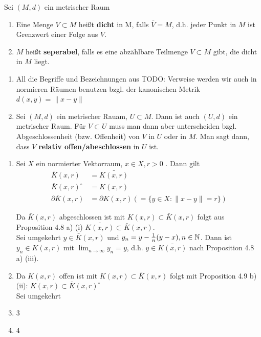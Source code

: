 \begin{definition}
	Sei $(M, d)$ ein metrischer Raum
	\begin{enumerate}[label=\alph*\upshape)]  
		\item Eine Menge $V \subset M$ hei{\ss}t \textbf{dicht} in M, falls $\bar V = M$, d.h. jeder Punkt in $M$ ist Grenzwert einer Folge aus $V$.
		\item $M$ hei{\ss}t \textbf{seperabel}, falls es eine abzählbare Teilmenge $V \subset M$ gibt, die dicht in $M$ liegt.
	\end{enumerate}
\end{definition}

\begin{bemerkung}
	\begin{enumerate}[label=\alph*\upshape)]   %
		\item All die Begriffe und Bezeichnungen aus TODO: Verweise werden wir auch in normieren Räumen benutzen bzgl. der kanonischen Metrik $d(x, y) = \| x - y\|$
		\item Sei $(M, d)$ ein metrischer Rauam, $U \subset M$. Dann ist auch $(U, d)$ ein metrischer Raum. Für $V \subset U$ muss man dann aber unterscheiden bzgl. Abgeschlossenheit (bzw. Offenheit) von $V$ in $U$ oder in $M$. Man sagt dann, dass $V$ \textbf{relativ offen/abeschlossen} in $U$ ist.
	\end{enumerate}	
\end{bemerkung}

\begin{beispiel}
	\begin{enumerate}[label=\alph*\upshape)]
		\item Sei $X$ ein normierter Vektorraum, $x \in X, r > 0$	. Dann gilt
			\begin{align*}
				\bar K(x, r) & = \bar{K(x, r)} \\
				\bar K(x, r)^{\circ} & = K(x, r) \\
				\partial \bar K(x, r) & = \partial K(x, r) (= \{ y \in X: \| x - y \| = r \} )
			\end{align*}
			\begin{beweis} %
				Da $ \bar K(x, r)$ abgeschlossen ist mit $K(x, r) \subset \bar K(x, r)$ folgt aus Proposition 4.8  a) (i) $\bar{K(x, r)} \subset \bar K(x, r)$. \\
				Sei umgekehrt $y \in \bar K(x, r)$ und $y_{n} = y - \frac{1}{n} (y - x), n \in \mathbb{N}$. Dann ist $y_{n} \in K(x, r)$ mit $\lim_{n \rightarrow \infty} y_{n} = y$, d.h. $y \in \bar{K(x, r)}$ nach Proposition 4.8 a) (iii).
			\end{beweis} %
		\item Da $K(x, r)$ offen ist mit $K(x, r) \subset \bar K(x, r)$ folgt mit Proposition 4.9 b) (ii): $K(x, r) \subset \bar K(x, r)^{\circ}$ \\
			Sei umgekehrt 
		\item 3 %
		\item 4 %
	\end{enumerate}
\end{beispiel}

